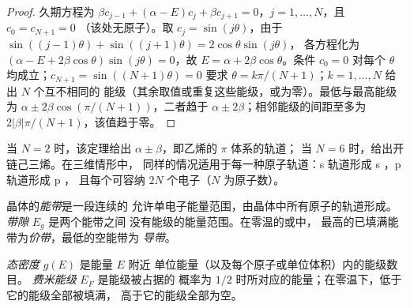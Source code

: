 \begin{proof}
久期方程为 $\beta c_{j-1} + (\alpha - E)c_j + \beta c_{j+1} = 0$，$j = 1, \dots, N$，且 $c_0 = c_{N+1} = 0$
（该处无原子）。取 $c_j = \sin(j\theta)$，由于 $\sin((j - 1)\theta) + \sin((j + 1)\theta) = 2\cos\theta\sin(j\theta)$，
各方程化为 $(\alpha - E + 2\beta\cos\theta)\sin(j\theta) = 0$，故 $E = \alpha + 2\beta\cos\theta$。条件 $c_0 = 0$
对每个 $\theta$ 均成立；$c_{N+1} = \sin((N + 1)\theta) = 0$ 要求 $\theta = k\pi/(N + 1)$；$k = 1, \dots, N$ 给出 $N$ 个互不相同的
能级（其余取值或重复这些能级，或为零）。最低与最高能级为
$\alpha \pm 2\beta\cos(\pi/(N + 1))$，二者趋于 $\alpha \pm 2\beta$；相邻能级的间距至多为
$2|\beta|\pi/(N + 1)$，该值趋于零。
\end{proof}

当 $N = 2$ 时，该定理给出 $\alpha \pm \beta$，即乙烯的 $\pi$ 体系的轨道；
当 $N = 6$ 时，给出开链己三烯。在三维情形中，
同样的情况适用于每一种原子轨道：s 轨道形成 s ，p 轨道形成 p ，
且每个可容纳 $2N$ 个电子（$N$ 为原子数）。

\begin{definition}[能带]\label{def:b3:solid-state:band}
晶体的\emph{能带}是一段连续的
允许单电子能量范围，由晶体中所有原子的轨道形成。
\emph{带隙} $E_g$ 是两个能带之间
没有能级的能量范围。在零温的或中，
最高的已填满能带为\emph{价带}，最低的空能带为
\emph{导带}。
\end{definition}

\begin{definition}[态密度与费米能级]\label{def:b3:solid-state:fermi}
\emph{态密度} $g(E)$ 是能量 $E$ 附近
单位能量（以及每个原子或单位体积）内的能级数目。
\emph{费米能级} $E_F$ 是能级被占据的
概率为 $1/2$ 时所对应的能量；在零温下，低于它的能级全部被填满，
高于它的能级全部为空。
\end{definition}

